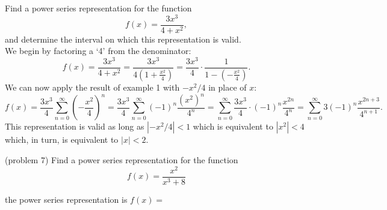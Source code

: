 \documentclass[handout]{ximera}
\begin{document}
\begin{example}[example 7]
Find a power series representation for the function
\[
f(x) = \frac{3x^3}{4 + x^2},
\]
and determine the interval on which this representation is valid.\\
We begin by factoring a `4' from the denominator:
\[
f(x) = \frac{3x^3}{4+x^2} = \frac{3x^3}{4(1 + \frac{x^2}{4})} = \frac{3x^3}{4} \cdot \frac{1}{1 - (-\frac{x^2}{4})}.
\]
We can now apply the result of example 1 with $-x^2 /4$ in place of $x$:
\[
f(x) = \frac{3x^3}{4} \sum_{n=0}^\infty \left(-\frac{x^2}{4}\right)^n = \frac{3x^3}{4} \sum_{n=0}^\infty (-1)^n \frac{(x^2)^n}{4^n}
=  \sum_{n=0}^\infty \frac{3x^3}{4} \cdot (-1)^n \frac{x^{2n}}{4^n} =  \sum_{n=0}^\infty 3 (-1)^n \frac{x^{2n+3}}{4^{n+1}}. 
\]
This representation is valid as long as $|-x^2/4| < 1$ which is equivalent to $|x^2| < 4$ which, in turn, is equivalent to $|x| < 2$.

\end{example}


\begin{problem}(problem 7)
Find a power series representation for the function
\[
f(x) = \frac{x^2}{x^3+8}
\]

the power series representation is $f(x) = $
\begin{multipleChoice}
\end{multipleChoice}
\end{problem}


\begin{center}
\begin{foldable}
\end{foldable}
\end{center}
\end{document}
